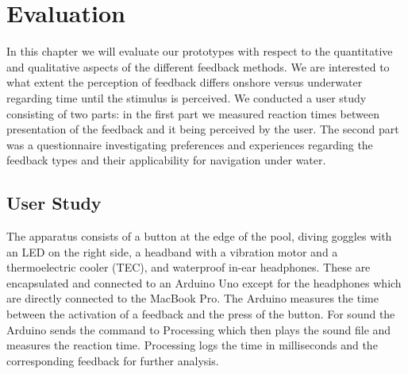 %

\chapter{Evaluation}
\label{evaluation}

In this chapter we will evaluate our prototypes with respect to the quantitative and qualitative aspects of the different feedback methods. We are interested to what extent the perception of feedback differs onshore versus underwater regarding time until the stimulus is perceived. 
We conducted a user study consisting of two parts: in the first part we measured reaction times between presentation of the feedback and it being perceived by the user.
The second part was a questionnaire investigating preferences and experiences regarding the feedback types and their applicability for navigation under water. 
  

\section{User Study}

The apparatus consists of a button at the edge of the pool, diving goggles with an LED on the right side, a headband with a vibration motor and a thermoelectric cooler (TEC), and waterproof in-ear headphones. 
These are encapsulated and connected to an Arduino Uno except for the headphones which are directly connected to the MacBook Pro. 
The Arduino measures the time between the activation of a feedback and the press of the button. 
For sound the Arduino sends the command to Processing which then plays the sound file and measures the reaction time. 
Processing logs the time in milliseconds and the corresponding feedback for further analysis.

